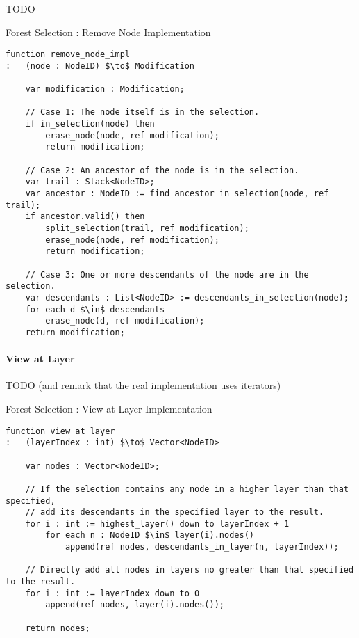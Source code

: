TODO

\begin{stulisting}[p]
\caption{Forest Selection : Remove Node Implementation}
\label{code:ipfs-selection-removenodeimpl}
\begin{lstlisting}[style=Default]
function remove_node_impl
:	(node : NodeID) $\to$ Modification

	var modification : Modification;

	// Case 1: The node itself is in the selection.
	if in_selection(node) then
		erase_node(node, ref modification);
		return modification;

	// Case 2: An ancestor of the node is in the selection.
	var trail : Stack<NodeID>;
	var ancestor : NodeID := find_ancestor_in_selection(node, ref trail);
	if ancestor.valid() then
		split_selection(trail, ref modification);
		erase_node(node, ref modification);
		return modification;

	// Case 3: One or more descendants of the node are in the selection.
	var descendants : List<NodeID> := descendants_in_selection(node);
	for each d $\in$ descendants
		erase_node(d, ref modification);
	return modification;
\end{lstlisting}
\end{stulisting}

\paragraph{View at Layer}

TODO (and remark that the real implementation uses iterators)

\begin{stulisting}[p]
\caption{Forest Selection : View at Layer Implementation}
\label{code:ipfs-selection-viewatlayer}
\begin{lstlisting}[style=Default]
function view_at_layer
:	(layerIndex : int) $\to$ Vector<NodeID>

	var nodes : Vector<NodeID>;

	// If the selection contains any node in a higher layer than that specified,
	// add its descendants in the specified layer to the result.
	for i : int := highest_layer() down to layerIndex + 1
		for each n : NodeID $\in$ layer(i).nodes()
			append(ref nodes, descendants_in_layer(n, layerIndex));

	// Directly add all nodes in layers no greater than that specified to the result.
	for i : int := layerIndex down to 0
		append(ref nodes, layer(i).nodes());

	return nodes;
\end{lstlisting}
\end{stulisting}

